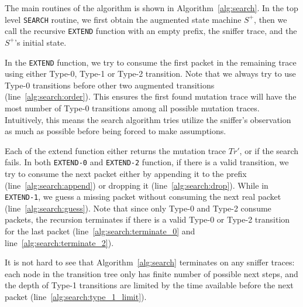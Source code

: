 The main routines of the algorithm is shown in Algorithm~\ref{alg:search}.  In
the top level \texttt{SEARCH} routine, we first obtain the augmented state
machine $S^+$, then we call the recursive \texttt{EXTEND} function with an empty
prefix, the sniffer trace, and the $S^+$'s initial state. 

In the \texttt{EXTEND} function, we try to consume the first packet in the
remaining trace using either Type-0, Type-1 or Type-2 transition.
Note that we always try to use Type-0 transitions before other two augmented
transitions (line~\ref{alg:search:order}).
This ensures the first found mutation trace will have the most number of Type-0
transitions among all possible mutation traces.
Intuitively, this means the search algorithm tries utilize the sniffer's
observation as much as possible before being forced to make assumptions.


Each of the extend function either returns the mutation trace $Tr'$, or
\textit{\nil} if the search fails.
In both \texttt{EXTEND-0} and
\texttt{EXTEND-2} function, if there is a valid transition, we try to consume
the next packet either by appending it to the prefix
(line~\ref{alg:search:append}) or dropping it (line~\ref{alg:search:drop}).
While in \texttt{EXTEND-1}, we guess a missing packet without consuming the next
real packet (line~\ref{alg:search:guess}).
Note that since only Type-0 and Type-2 consume packets, the recursion terminates
if there is a valid Type-0 or Type-2 transition for the last packet
(line~\ref{alg:search:terminate_0} and line~\ref{alg:search:terminate_2}).



It is not hard to see that Algorithm~\ref{alg:search} terminates on any sniffer
traces: each node in the transition tree only has finite number of possible next
steps, and the depth of Type-1 transitions are limited by the time available
before the next packet (line~\ref{alg:search:type_1_limit}).
